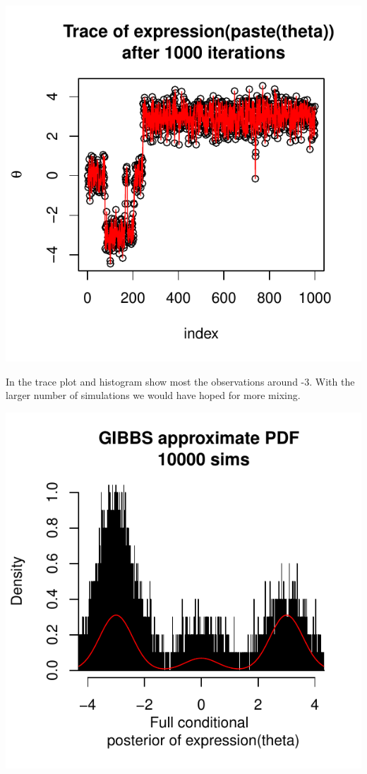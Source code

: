 \documentclass{article}\usepackage[]{graphicx}\usepackage[]{color}
\makeatletter
\def\maxwidth{ %
  \ifdim\Gin@nat@width>\linewidth
    \linewidth
  \else
    \Gin@nat@width
  \fi
}
\makeatother
\begin{document}
\begin{enumerate}
\includegraphics[width=\maxwidth]{figure/prob2e4-2} 


In the trace plot and histogram show most the observations around -3. With the larger number of simulations we would have hoped for more mixing.


\includegraphics[width=\maxwidth]{figure/prob2e5-1} 


\end{enumerate}
\end{document}
